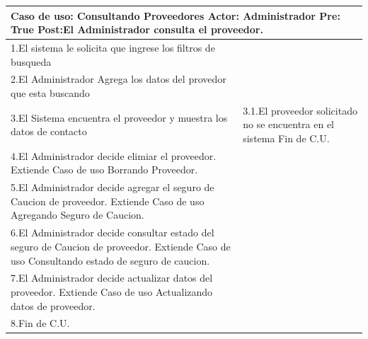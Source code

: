 \begin{longtable}{| p{} | p{} |} 
    \hline
    \multicolumn{2}{|p{16cm}|}{
        \textbf{Caso de uso:} Consultando Proveedores \newline
        \textbf{Actor:} Administrador\newline
        \textbf{Pre:}  True\newline
        \textbf{Post:}El Administrador consulta el proveedor.
    }\\
    \hline
    1.El sistema le solicita que ingrese los filtros de busqueda  & \\
    \hline
    2.El Administrador Agrega los datos del provedor que esta buscando& \\
    \hline
    3.El Sistema encuentra el proveedor y muestra los datos de contacto & 3.1.El proveedor solicitado no se encuentra en el sistema \newline 3.2 Fin de C.U.  \\
    \hline
    4.El Administrador decide elimiar el proveedor. Extiende Caso de uso Borrando Proveedor.& \\
    \hline
    5.El Administrador decide agregar el seguro de Caucion de proveedor. Extiende Caso de uso Agregando Seguro de Caucion.& \\
    \hline
    6.El Administrador decide consultar estado del seguro de Caucion de proveedor. Extiende Caso de uso Consultando estado de seguro de caucion.& \\
    \hline
    7.El Administrador decide actualizar datos del proveedor. Extiende Caso de uso Actualizando datos de proveedor.& \\
    \hline
    8.Fin de C.U.& \\
    \hline
\end{longtable}

